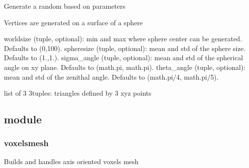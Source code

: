 \documentclass[letterpaper,10pt,english]{sphinxmanual}
\begin{document}
\begin{fulllineitems}
\label{\detokenize{reference:trianglesmesh.random_triangle_generator}}
\pysigstartsignatures
{}
\pysigstopsignatures
\sphinxAtStartPar
Generate a random based on parameters

\sphinxAtStartPar
Vertices are generated on a surface of a sphere
\begin{description}
\sphinxAtStartPar
worldsize (tuple, optional): min and max where sphere center can be generated. Defaults to (0,100).
spheresize (tuple, optional): mean and std of the sphere size. Defaults to (1.,1.).
sigma\_angle (tuple, optional): mean and std of the spherical angle on xy plane. Defaults to (math.pi, math.pi).
theta\_angle (tuple, optional): mean and std of the zenithal angle. Defaults to (math.pi/4, math.pi/5).

\sphinxAtStartPar
list of 3 3\sphinxhyphen{}tuples: triangles defined by 3 xyz points

\end{description}

\end{fulllineitems}



\subsection{ module}
\label{\detokenize{reference:module-voxelsmesh}}\label{\detokenize{reference:voxelsmesh-module}}

\subsubsection{voxelsmesh}
\label{\detokenize{reference:voxelsmesh}}
\sphinxAtStartPar
Builds and handles axis oriented voxels mesh
\end{document}

